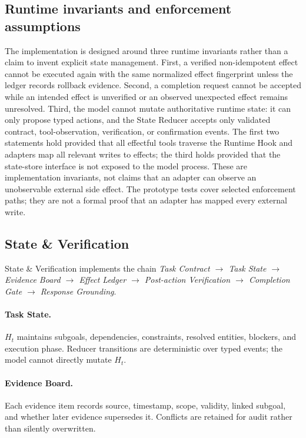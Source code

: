 \documentclass[10pt]{article}
\begin{document}
\subsection{Runtime invariants and enforcement assumptions}
\label{sec:invariants}

The implementation is designed around three runtime invariants rather than a
claim to invent explicit state management. First, a verified non-idempotent effect
cannot be executed again with the same normalized effect fingerprint unless the
ledger records rollback evidence. Second, a completion request cannot be accepted
while an intended effect is unverified or an observed unexpected effect remains
unresolved. Third, the model cannot mutate authoritative runtime state: it can only
propose typed actions, and the State Reducer accepts only validated contract,
tool-observation, verification, or confirmation events. The first two statements
hold provided that all effectful tools traverse the Runtime Hook and adapters map
all relevant writes to effects; the third holds provided that the state-store
interface is not exposed to the model process. These are implementation invariants,
not claims that an adapter can observe an unobservable external side effect. The
prototype tests cover selected enforcement paths; they are not a formal proof that
an adapter has mapped every external write.

\subsection{State \& Verification}

State \& Verification implements the chain
\emph{Task Contract $\rightarrow$ Task State $\rightarrow$ Evidence Board
$\rightarrow$ Effect Ledger $\rightarrow$ Post-action Verification
$\rightarrow$ Completion Gate $\rightarrow$ Response Grounding}.

\paragraph{Task State.}
$H_t$ maintains subgoals, dependencies, constraints, resolved entities, blockers,
and execution phase. Reducer transitions are deterministic over typed events; the
model cannot directly mutate $H_t$.

\paragraph{Evidence Board.}
Each evidence item records source, timestamp, scope, validity, linked subgoal, and
whether later evidence supersedes it. Conflicts are retained for audit rather than
silently overwritten.
\end{document}
